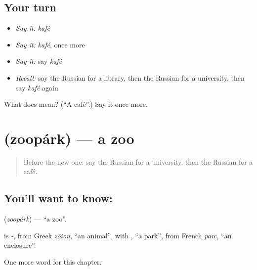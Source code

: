 \subsection*{Your turn}
\begin{itemize}
\raggedright
  \item \emph{Say it:} \emph{kafé}
  \item \emph{Say it:} \emph{kafé}, once more
  \item \emph{Say it:} say \emph{kafé}
  \item \emph{Recall:} say the Russian for a library, then the Russian for a university, then say \emph{kafé} again
\end{itemize}

\begin{tcolorbox}[breakable,colback=teal!4,colframe=teal!35!black,title={Before you move on}]
What does  mean? (\textquotedblleft{}A café\textquotedblright{}.) Say it once more.
\end{tcolorbox}
\section[\texorpdfstring{\ru{зоопарк} (zoopárk)}{зоопарк (zoopárk)}]{ (zoopárk) — a zoo}

\label{lesson:RU-C242-zoopark}



\begin{quote}
Before the new one: say the Russian for a university, then the Russian for a café.
\end{quote}

\subsection*{You'll want to know: }
\textbf{} (\emph{zoopárk}) — \textquotedblleft{}a zoo\textquotedblright{}.

\begin{cousinweb}
\textbf{} is \emph{-}, from Greek \emph{zôion}, \textquotedblleft{}an animal\textquotedblright{}, with \emph{}, \textquotedblleft{}a park\textquotedblright{}, from French \emph{parc}, \textquotedblleft{}an enclosure\textquotedblright{}.
\end{cousinweb}

\begin{grammarlens}[title={What you've built}]
One more word for this chapter.
\end{grammarlens}

